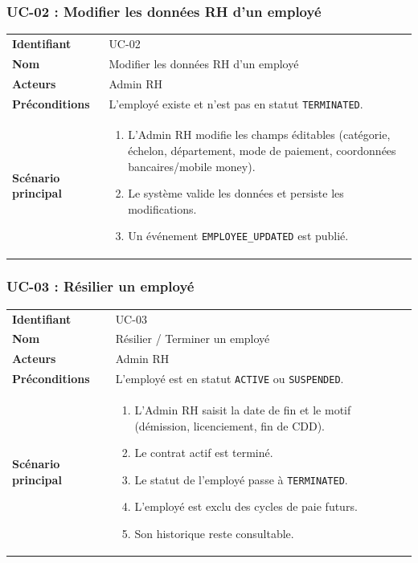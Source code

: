 \documentclass[a4paper,12pt,openany]{book}
\begin{document}
    \subsubsection*{UC-02 : Modifier les données RH d'un employé}
    \begin{table}[H]
        \centering
        \begin{tabularx}{\textwidth}{lX}
    \toprule
    \textbf{Identifiant} & UC-02 \\
    \textbf{Nom}         & Modifier les données RH d'un employé \\
    \textbf{Acteurs}     & Admin RH \\
    \textbf{Préconditions} & L'employé existe et n'est pas en statut \texttt{TERMINATED}. \\
    \midrule
    \textbf{Scénario principal} &
    \begin{enumerate}[nosep]
      \item L'Admin RH modifie les champs éditables (catégorie, échelon, département, mode de paiement, coordonnées bancaires/mobile money).
      \item Le système valide les données et persiste les modifications.
      \item Un événement \texttt{EMPLOYEE\_UPDATED} est publié.
    \end{enumerate} \\
    \bottomrule
        \end{tabularx}
    \end{table}

    \subsubsection*{UC-03 : Résilier un employé}
    \begin{table}[H]
        \centering
        \begin{tabularx}{\textwidth}{lX}
    \toprule
    \textbf{Identifiant} & UC-03 \\
    \textbf{Nom}         & Résilier / Terminer un employé \\
    \textbf{Acteurs}     & Admin RH \\
    \textbf{Préconditions} & L'employé est en statut \texttt{ACTIVE} ou \texttt{SUSPENDED}. \\
    \midrule
    \textbf{Scénario principal} &
    \begin{enumerate}[nosep]
      \item L'Admin RH saisit la date de fin et le motif (démission, licenciement, fin de CDD).
      \item Le contrat actif est terminé.
      \item Le statut de l'employé passe à \texttt{TERMINATED}.
      \item L'employé est exclu des cycles de paie futurs.
      \item Son historique reste consultable.
    \end{enumerate} \\
    \bottomrule
        \end{tabularx}
    \end{table}
\end{document}
